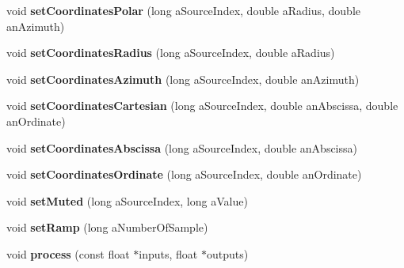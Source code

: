\begin{DoxyCompactItemize}
\item 
\hypertarget{class_ambisonics_multi_maps_a0896d78a07c0153b12670b4bd692a29d}{void {\bfseries set\-Coordinates\-Polar} (long a\-Source\-Index, double a\-Radius, double an\-Azimuth)}\label{class_ambisonics_multi_maps_a0896d78a07c0153b12670b4bd692a29d}

\item 
\hypertarget{class_ambisonics_multi_maps_a07adae9006fffcf2e86e2a866117a6f0}{void {\bfseries set\-Coordinates\-Radius} (long a\-Source\-Index, double a\-Radius)}\label{class_ambisonics_multi_maps_a07adae9006fffcf2e86e2a866117a6f0}

\item 
\hypertarget{class_ambisonics_multi_maps_ad8bb7e3bc844e8a5dccca8f5f08c9a36}{void {\bfseries set\-Coordinates\-Azimuth} (long a\-Source\-Index, double an\-Azimuth)}\label{class_ambisonics_multi_maps_ad8bb7e3bc844e8a5dccca8f5f08c9a36}

\item 
\hypertarget{class_ambisonics_multi_maps_a1821484046b0282aec56ce53cf4dcc37}{void {\bfseries set\-Coordinates\-Cartesian} (long a\-Source\-Index, double an\-Abscissa, double an\-Ordinate)}\label{class_ambisonics_multi_maps_a1821484046b0282aec56ce53cf4dcc37}

\item 
\hypertarget{class_ambisonics_multi_maps_af6559d6c5430147c3e3b632a9d16984c}{void {\bfseries set\-Coordinates\-Abscissa} (long a\-Source\-Index, double an\-Abscissa)}\label{class_ambisonics_multi_maps_af6559d6c5430147c3e3b632a9d16984c}

\item 
\hypertarget{class_ambisonics_multi_maps_a8c3a2b27fc3f4b2bcbd82c77d6cd80b7}{void {\bfseries set\-Coordinates\-Ordinate} (long a\-Source\-Index, double an\-Ordinate)}\label{class_ambisonics_multi_maps_a8c3a2b27fc3f4b2bcbd82c77d6cd80b7}

\item 
\hypertarget{class_ambisonics_multi_maps_ab022a734821cfcc08af825eb761c6179}{void {\bfseries set\-Muted} (long a\-Source\-Index, long a\-Value)}\label{class_ambisonics_multi_maps_ab022a734821cfcc08af825eb761c6179}

\item 
\hypertarget{class_ambisonics_multi_maps_ac343b301c27a796e5d081e6e92477cbd}{void {\bfseries set\-Ramp} (long a\-Number\-Of\-Sample)}\label{class_ambisonics_multi_maps_ac343b301c27a796e5d081e6e92477cbd}

\item 
\hypertarget{class_ambisonics_multi_maps_a9661cac4012f4d1df56f378a73075b1f}{void {\bfseries process} (const float $\ast$inputs, float $\ast$outputs)}\label{class_ambisonics_multi_maps_a9661cac4012f4d1df56f378a73075b1f}


\end{DoxyCompactItemize}
